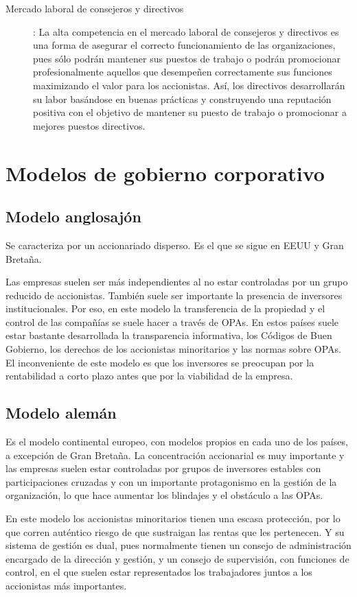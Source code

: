 \documentclass[12pt,a4paper,spanish]{report}
\begin{document}
\begin{description}
						\item[Mercado laboral de consejeros y directivos]: La alta competencia en el mercado laboral de consejeros y directivos es una forma de asegurar el correcto funcionamiento de las organizaciones, pues sólo podrán mantener sus puestos de trabajo o podrán promocionar profesionalmente aquellos que desempeñen correctamente sus funciones maximizando el valor para los accionistas. Así, los directivos desarrollarán su labor basándose en buenas prácticas y construyendo una reputación positiva con el objetivo de mantener su puesto de trabajo o promocionar a mejores puestos directivos.
					\end{description}
	\section{\textcolor[rgb]{0.9,0.3,0.3}Modelos de gobierno corporativo}
		\subsection{\textcolor[rgb]{0.9,0.3,0.3}Modelo anglosajón}
			Se caracteriza por un accionariado disperso. Es el que se sigue en EEUU y Gran Bretaña.

			Las empresas suelen ser más independientes al no estar controladas por un grupo reducido de accionistas. También suele ser importante la presencia de inversores institucionales. Por eso, en este modelo la transferencia de la propiedad y el control de las compañías se suele hacer a través de OPAs. En estos países suele estar bastante desarrollada la transparencia informativa, los Códigos de Buen Gobierno, los derechos de los accionistas minoritarios y las normas sobre OPAs. El inconveniente de este modelo es que los inversores se preocupan por la rentabilidad a corto plazo antes que por la viabilidad de la empresa.

		\subsection{\textcolor[rgb]{0.9,0.3,0.3}Modelo alemán}
			Es el modelo continental europeo, con modelos propios en cada uno de los países, a excepción de Gran Bretaña. La concentración accionarial es muy importante y las empresas suelen estar controladas por grupos de inversores estables con participaciones cruzadas y con un importante protagonismo en la gestión de la organización, lo que hace aumentar los blindajes y el obstáculo a las OPAs.

			En este modelo los accionistas minoritarios tienen una escasa protección, por lo que corren auténtico riesgo de que sustraigan las rentas que les pertenecen. Y su sistema de gestión es dual, pues normalmente tienen un consejo de administración encargado de la dirección y gestión, y un consejo de supervisión, con funciones de control, en el que suelen estar representados los trabajadores juntos a los accionistas más importantes.
\end{document}
